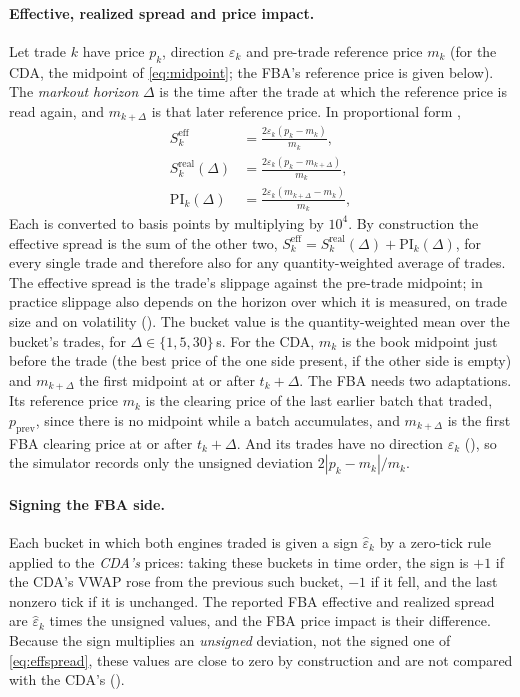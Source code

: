 \paragraph{Effective, realized spread and price impact.} Let trade
$k$ have price $p_k$, direction $\varepsilon_k$ and pre-trade reference
price $m_k$ (for the CDA, the midpoint of \eqref{eq:midpoint}; the FBA's
reference price is given below). The \emph{markout horizon} $\Delta$ is
the time after the trade at which the reference price is read again, and
$m_{k+\Delta}$ is that later reference price.
In proportional form \citep{hasbrouck1993assessing,hendershott2011algorithmic},
\begin{align}
  S^{\mathrm{eff}}_k &= \frac{2 \varepsilon_k (p_k - m_k)}{m_k},
    \label{eq:effspread}\\[3pt]
  S^{\mathrm{real}}_k(\Delta) &= \frac{2 \varepsilon_k (p_k - m_{k+\Delta})}{m_k},
    \label{eq:realspread}\\[3pt]
  \mathrm{PI}_k(\Delta) &= \frac{2 \varepsilon_k (m_{k+\Delta} - m_k)}{m_k},
    \label{eq:priceimpact}
\end{align}
Each is converted to basis points by multiplying by $10^{4}$. By
construction the effective spread is the sum of the other two,
$S^{\mathrm{eff}}_k = S^{\mathrm{real}}_k(\Delta) + \mathrm{PI}_k(\Delta)$,
for every single trade and therefore also for any quantity-weighted average
of trades. The effective spread is the trade's
slippage against the pre-trade midpoint; in practice slippage also
depends on the horizon over which it is measured, on trade size and on
volatility (). The bucket value is the
quantity-weighted mean over the bucket's trades, for $\Delta \in
\{1, 5, 30\}$\,s. For the CDA, $m_k$ is the book midpoint just before the
trade (the best price of the one side present, if the other side is
empty) and $m_{k+\Delta}$ the first midpoint at or after $t_k + \Delta$.
The FBA needs two adaptations. Its reference price $m_k$ is the clearing
price of the last earlier batch that traded, $p_{\mathrm{prev}}$, since
there is no midpoint while a batch accumulates, and $m_{k+\Delta}$ is the
first FBA clearing price at or after $t_k + \Delta$. And its trades have no direction $\varepsilon_k$
(), so the simulator records only the unsigned
deviation $2|p_k - m_k|/m_k$.

\paragraph{Signing the FBA side.} Each bucket in which both engines
traded is given a sign $\hat\varepsilon_k$ by a zero-tick rule
\citep{leeready1991} applied to the \emph{CDA's} prices: taking these
buckets in time order, the sign is $+1$ if the CDA's VWAP rose from the
previous such bucket, $-1$ if it fell, and the last nonzero tick if it is
unchanged. The reported FBA effective and realized spread are
$\hat\varepsilon_k$ times the unsigned values, and the FBA price impact is
their difference. Because the sign multiplies an \emph{unsigned}
deviation, not the signed one of \eqref{eq:effspread}, these values are
close to zero by construction and are not compared with the CDA's
().

